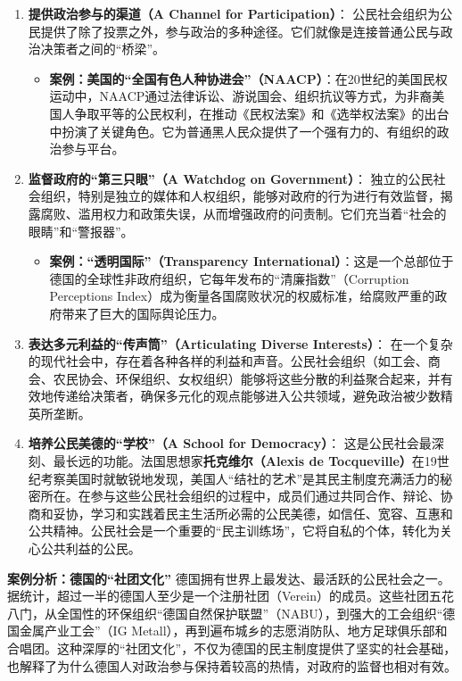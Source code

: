 \begin{enumerate}
    \item \textbf{提供政治参与的渠道（A Channel for Participation）}：
    公民社会组织为公民提供了除了投票之外，参与政治的多种途径。它们就像是连接普通公民与政治决策者之间的“桥梁”。
    \begin{itemize}
        \item \textbf{案例：美国的“全国有色人种协进会”（NAACP）}：在20世纪的美国民权运动中，NAACP通过法律诉讼、游说国会、组织抗议等方式，为非裔美国人争取平等的公民权利，在推动《民权法案》和《选举权法案》的出台中扮演了关键角色。它为普通黑人民众提供了一个强有力的、有组织的政治参与平台。
    \end{itemize}
    \item \textbf{监督政府的“第三只眼”（A Watchdog on Government）}：
    独立的公民社会组织，特别是独立的媒体和人权组织，能够对政府的行为进行有效监督，揭露腐败、滥用权力和政策失误，从而增强政府的问责制。它们充当着“社会的眼睛”和“警报器”。
    \begin{itemize}
        \item \textbf{案例：“透明国际”（Transparency International）}：这是一个总部位于德国的全球性非政府组织，它每年发布的“清廉指数”（Corruption Perceptions Index）成为衡量各国腐败状况的权威标准，给腐败严重的政府带来了巨大的国际舆论压力。
    \end{itemize}
    \item \textbf{表达多元利益的“传声筒”（Articulating Diverse Interests）}：
    在一个复杂的现代社会中，存在着各种各样的利益和声音。公民社会组织（如工会、商会、农民协会、环保组织、女权组织）能够将这些分散的利益聚合起来，并有效地传递给决策者，确保多元化的观点能够进入公共领域，避免政治被少数精英所垄断。
    \item \textbf{培养公民美德的“学校”（A School for Democracy）}：
    这是公民社会最深刻、最长远的功能。法国思想家\textbf{托克维尔（Alexis de Tocqueville）}在19世纪考察美国时就敏锐地发现，美国人“结社的艺术”是其民主制度充满活力的秘密所在。在参与这些公民社会组织的过程中，成员们通过共同合作、辩论、协商和妥协，学习和实践着民主生活所必需的公民美德，如信任、宽容、互惠和公共精神。公民社会是一个重要的“民主训练场”，它将自私的个体，转化为关心公共利益的公民。
\end{enumerate}

\textbf{案例分析：德国的“社团文化”}
德国拥有世界上最发达、最活跃的公民社会之一。据统计，超过一半的德国人至少是一个注册社团（Verein）的成员。这些社团五花八门，从全国性的环保组织“德国自然保护联盟”（NABU），到强大的工会组织“德国金属产业工会”（IG Metall），再到遍布城乡的志愿消防队、地方足球俱乐部和合唱团。这种深厚的“社团文化”，不仅为德国的民主制度提供了坚实的社会基础，也解释了为什么德国人对政治参与保持着较高的热情，对政府的监督也相对有效。

